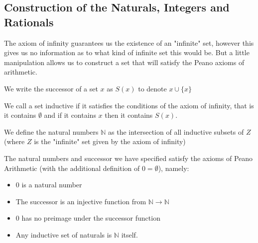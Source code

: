 \documentclass[]{article}
\begin{document}
\subsection{Construction of the Naturals, Integers and Rationals}

	The axiom of infinity guarantees us the existence of an "infinite" set, however this gives us no information as to what kind of infinite set this would be. But a little manipulation allows us to construct a set that will satisfy the Peano axioms of arithmetic.

	\begin{defi} [Successor]
		We write the successor of a set $x$ as $S(x)$ to denote $x \cup \{x\}$
	\end{defi}
	
	\begin{defi} 
		We call a set inductive if it satisfies the conditions of the axiom of infinity, that is it contains $\emptyset$ and if it contains $x$ then it contains $S(x)$. 
	\end{defi}

	\begin{defi} 
			We define the natural numbers $\mathbb{N}$ as the intersection of all inductive subsets of $Z$ (where $Z$ is the "infinite" set given by the axiom of infinity)
	\end{defi}

	\begin{thm}  \label{thm:peano}
			The natural numbers and successor we have specified satisfy the axioms of Peano Arithmetic (with the additional definition of $0 = \emptyset$), namely:
			\begin{itemize}
					\item $0$ is a natural number	
					\item The successor is an injective function from $\mathbb{N} \to \mathbb{N}$ 
					\item $0$ has no preimage under the successor function
					\item Any inductive set of naturals is $\mathbb{N}$ itself.
			\end{itemize}
	\end{thm}
\end{document}

